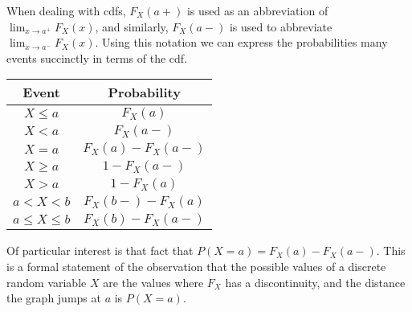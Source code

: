 \par
When dealing with cdfs, $F_X(a+)$ is used as an abbreviation of $\lim_{x \to a^{+}}F_X(x)$, and similarly, $F_X(a-)$ is used to abbreviate $\lim_{x \to a^{-}}F_X(x)$. Using this notation we can express the probabilities many events succinctly in terms of the cdf.

\begin{center}
\begin{tabular}{c|c}
Event & Probability \\
\hline
$X \leq a$ & $F_X(a)$ \\
$X < a$ & $F_X(a-)$ \\
$X = a$ & $F_X(a) - F_X(a-)$ \\
$X \geq a$ & $1 - F_X(a-)$ \\
$X > a$ & $1 - F_X(a)$ \\
$a < X < b$ & $F_X(b-) - F_X(a)$ \\
$a \leq X \leq b$  & $F_X(b) - F_X(a-)$ \\
\end{tabular}
\end{center}

Of particular interest is that fact that $P(X=a) = F_X(a) - F_X(a-)$. This is a formal statement of the observation that the possible values of a discrete random variable $X$ are the values where $F_X$ has a discontinuity, and the distance the graph jumps at $a$ is $P(X = a)$.

